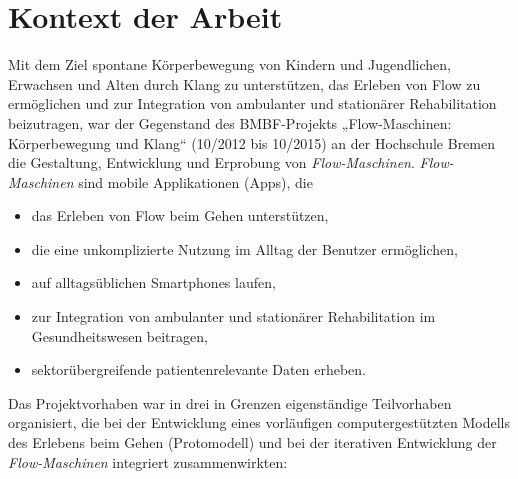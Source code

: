 
\section{Kontext der Arbeit} %
\label{sec:kontext_der_arbeit}

Mit dem Ziel spontane Körperbewegung von Kindern und Jugendlichen, Erwachsen und Alten durch Klang zu unterstützen, das Erleben von Flow zu ermöglichen und zur Integration von ambulanter und stationärer Rehabilitation beizutragen, war der Gegenstand des \acs{BMBF}-Projekts „Flow-Maschinen: Körperbewegung und Klang“ (10/2012 bis 10/2015) an der Hochschule Bremen die Gestaltung, Entwicklung und Erprobung von \emph{Flow-Maschinen}. \emph{Flow-Maschinen} sind mobile Applikationen (Apps), die
\begin{itemize}

	\item das Erleben von Flow beim Gehen unterstützen,

	\item die eine unkomplizierte Nutzung im Alltag der Benutzer ermöglichen,

	\item auf alltagsüblichen Smartphones laufen,

	\item zur Integration von ambulanter und stationärer Rehabilitation im Gesundheitswesen beitragen,

	\item sektorübergreifende patientenrelevante Daten erheben.

\end{itemize}

Das Projektvorhaben war in drei in Grenzen eigenständige Teilvorhaben organisiert, die bei der Entwicklung eines vorläufigen computergestützten Modells des Erlebens beim Gehen (Protomodell) und bei der iterativen Entwicklung der \emph{Flow-Maschinen} integriert zusammenwirkten:

